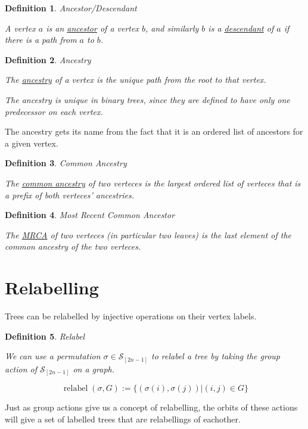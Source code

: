 \documentclass[10pt,a4paper]{report}
\DeclareMathOperator{\relabel}{relabel}
\newcommand{\Sym}{\mathcal{S}}
\newtheorem{definition}{Definition}
\begin{document}
\begin{definition} Ancestor/Descendant

	A vertex $a$ is an \underline{ancestor} of a vertex $b$, and similarly $b$
	is a \underline{descendant} of $a$ if there is a path from $a$ to $b$.
\end{definition}

\begin{definition} Ancestry

	The \underline{ancestry} of a vertex is the unique path from the root to
	that vertex.

	The ancestry is unique in binary trees, since they are defined to have only
	one predecessor on each vertex.
\end{definition}

The ancestry gets its name from the fact that it is an ordered list of
ancestors for a given vertex.

\begin{definition} Common Ancestry

	The \underline{common ancestry} of two verteces is the largest ordered list
	of verteces that is a prefix of both verteces' ancestries.
\end{definition}

\begin{definition} Most Recent Common Ancestor

	The \underline{MRCA} of two verteces (in particular two leaves) is the last
	element of the common ancestry of the two verteces.
\end{definition}

\section{Relabelling}

Trees can be relabelled by injective operations on their vertex labels.

\begin{definition} Relabel

	We can use a permutation $\sigma \in \Sym_[2n-1]$ to relabel a tree by
	taking the group action of $\Sym_[2n-1]$ on a graph.

	\[
		\relabel(\sigma, G) := \{(\sigma(i), \sigma(j)) | (i, j) \in G\}
	\]
\end{definition}

Just as group actions give us a concept of relabelling, the orbits of these
actions will give a set of labelled trees that are relabellings of eachother.
\end{document}
